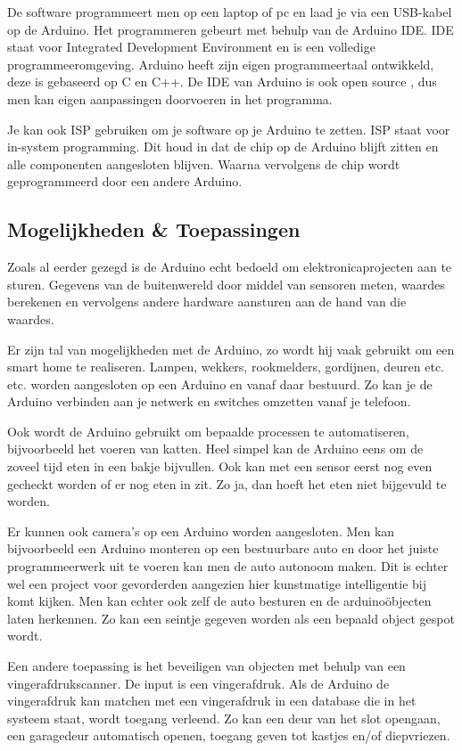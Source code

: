 \documentclass[a4paper, dutch, abstract=true]{scrartcl}
\begin{document}
De software programmeert men op een laptop of pc en laad je via een USB-kabel op de Arduino.
Het programmeren gebeurt met behulp van de Arduino IDE.
IDE staat voor Integrated Development Environment en is een volledige programmeeromgeving.
Arduino heeft zijn eigen programmeertaal ontwikkeld, deze is gebaseerd op C en C++.
De IDE van Arduino is ook open source \cite{arduino2019github}, dus men kan eigen aanpassingen
doorvoeren in het programma.

Je kan ook ISP gebruiken om je software op je Arduino te zetten.
ISP staat voor in-system programming.
Dit houd in dat de chip op de Arduino blijft zitten en alle componenten aangesloten blijven.
Waarna vervolgens de chip wordt geprogrammeerd door een andere Arduino.

\subsection{Mogelijkheden \& Toepassingen}
Zoals al eerder gezegd is de Arduino echt bedoeld om elektronicaprojecten aan te sturen.
Gegevens van de buitenwereld door middel van sensoren meten, waardes berekenen en vervolgens andere
hardware aansturen aan de hand van die waardes.

Er zijn tal van mogelijkheden met de Arduino, zo wordt hij vaak gebruikt om een smart home te
realiseren.
Lampen, wekkers, rookmelders, gordijnen, deuren etc. etc. worden aangesloten op een Arduino en vanaf
daar bestuurd.
Zo kan je de Arduino verbinden aan je netwerk en switches omzetten vanaf je telefoon.

Ook wordt de Arduino gebruikt om bepaalde processen te automatiseren, bijvoorbeeld het voeren van
katten.
Heel simpel kan de Arduino eens om de zoveel tijd eten in een bakje bijvullen.
Ook kan met een sensor eerst nog even gecheckt worden of er nog eten in zit.
Zo ja, dan hoeft het eten niet bijgevuld te worden.

Er kunnen ook camera's op een Arduino worden aangesloten.
Men kan bijvoorbeeld een Arduino monteren op een bestuurbare auto en door het juiste programmeerwerk
uit te voeren kan men de auto autonoom maken.
Dit is echter wel een project voor gevorderden aangezien hier kunstmatige intelligentie bij komt
kijken.
Men kan echter ook zelf de auto besturen en de arduino{\"o}bjecten laten herkennen.
Zo kan een seintje gegeven worden als een bepaald object gespot wordt.

Een andere toepassing is het beveiligen van objecten met behulp van een vingerafdrukscanner.
De input is een vingerafdruk.
Als de Arduino de vingerafdruk kan matchen met een vingerafdruk in een database die in het systeem
staat, wordt toegang verleend.
Zo kan een deur van het slot opengaan, een garagedeur automatisch openen, toegang geven tot kastjes
en/of diepvriezen.
\end{document}
